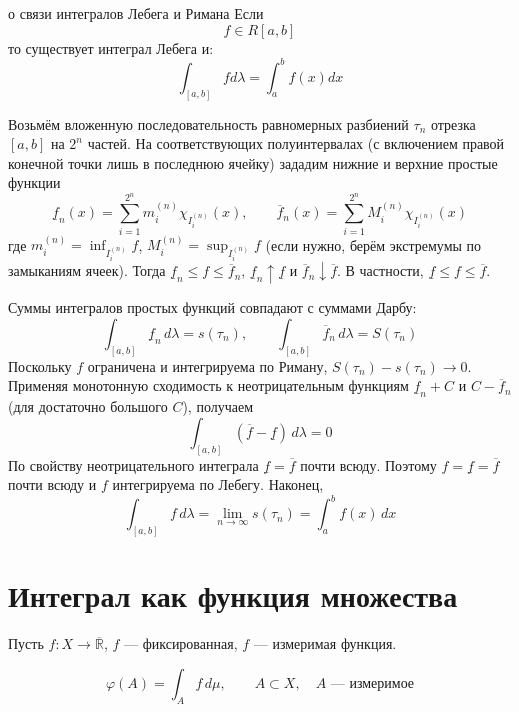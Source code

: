 \documentclass[12pt,a4paper]{article}
\begin{document}
\begin{theorem}{о связи интегралов Лебега и Римана}
    Если
    \[
        f\in R[a,b]
    \]
    то существует интеграл Лебега и:
    \[
        \int_{[a,b]}f d\lambda
        =
        \int_a^bf(x) dx
    \]
\end{theorem}

\begin{proofbox}{}
    Возьмём вложенную последовательность равномерных разбиений
    $\tau_n$ отрезка $[a,b]$ на $2^n$ частей. На соответствующих
    полуинтервалах (с включением правой конечной точки лишь в
    последнюю ячейку) зададим нижние и верхние простые функции
    \[
        \underline f_n(x)=\sum_{i=1}^{2^n}m_i^{(n)}\chi_{I_i^{(n)}}(x),
        \qquad
        \overline f_n(x)=\sum_{i=1}^{2^n}M_i^{(n)}\chi_{I_i^{(n)}}(x)
    \]
    где $m_i^{(n)}=\inf_{I_i^{(n)}}f$, $M_i^{(n)}=\sup_{I_i^{(n)}}f$
    (если нужно, берём экстремумы по замыканиям ячеек).
    Тогда $\underline f_n\leq f\leq\overline f_n$,
    $\underline f_n\uparrow\underline f$ и
    $\overline f_n\downarrow\overline f$.
    В частности, $\underline f\leq f\leq\overline f$.

    Суммы интегралов простых функций совпадают с суммами Дарбу:
    \[
        \int_{[a,b]}\underline f_n\,d\lambda=s(\tau_n),
        \qquad
        \int_{[a,b]}\overline f_n\,d\lambda=S(\tau_n)
    \]
    Поскольку $f$ ограничена и интегрируема по Риману,
    $S(\tau_n)-s(\tau_n)\to0$. Применяя монотонную сходимость
    к неотрицательным функциям $\underline f_n+C$ и
    $C-\overline f_n$ (для достаточно большого $C$), получаем
    \[
        \int_{[a,b]}(\overline f-\underline f)\,d\lambda=0
    \]
    По свойству неотрицательного интеграла
    $\underline f=\overline f$ почти всюду. Поэтому
    $f=\underline f=\overline f$ почти всюду и $f$ интегрируема
    по Лебегу. Наконец,
    \[
        \int_{[a,b]}f\,d\lambda
        =\lim_{n\to\infty}s(\tau_n)
        =\int_a^b f(x)\,dx
    \]
\end{proofbox}

\newpage

\section{Интеграл как функция множества}

Пусть $f\colon X\to\overline{\mathbb{R}}$, $f$ --- фиксированная, $f$ --- измеримая функция.

\[
    \varphi(A)=\int_A f\,d\mu,
    \qquad
    A\subset X,\quad A\text{ --- измеримое}
\]
\end{document}
